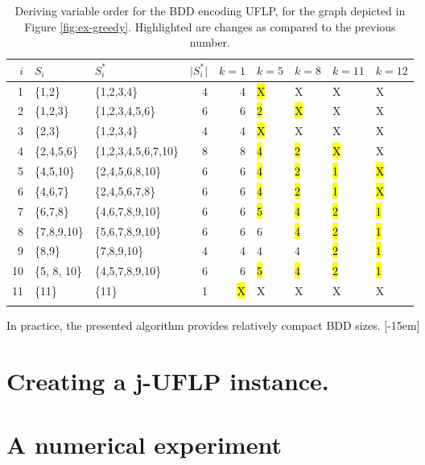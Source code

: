 \documentclass[11pt]{article}
\begin{document}
\begin{example}
\begin{table}[htbp]
\caption{\label{tab:greedy}Deriving variable order for the BDD encoding UFLP, for the graph depicted in Figure \ref{fig:ex-greedy}. Highlighted are changes as compared to the previous number.}
\centering
\begin{tabular}{rllrrllll}
\textcircled{$i$} & \(S_i\) & \(S^*_i\) & \(\vert S^*_i\vert\) & \(k=1\) & \(k=5\) & \(k=8\) & \(k=11\) & \(k=12\)\\
\hline
1 & \{1,2\} & \{1,2,3,4\} & 4 & 4 & \hl{X} & X & X & X\\
2 & \{1,2,3\} & \{1,2,3,4,5,6\} & 6 & 6 & \hl{2} & \hl{X} & X & X\\
3 & \{2,3\} & \{1,2,3,4\} & 4 & 4 & \hl{X} & X & X & X\\
4 & \{2,4,5,6\} & \{1,2,3,4,5,6,7,10\} & 8 & 8 & \hl{4} & \hl{2} & \hl{X} & X\\
5 & \{4,5,10\} & \{2,4,5,6,8,10\} & 6 & 6 & \hl{4} & \hl{2} & \hl{1} & \hl{X}\\
6 & \{4,6,7\} & \{2,4,5,6,7,8\} & 6 & 6 & \hl{4} & \hl{2} & \hl{1} & \hl{X}\\
7 & \{6,7,8\} & \{4,6,7,8,9,10\} & 6 & 6 & \hl{5} & \hl{4} & \hl{2} & \hl{1}\\
8 & \{7,8,9,10\} & \{5,6,7,8,9,10\} & 6 & 6 & 6 & \hl{4} & \hl{2} & \hl{1}\\
9 & \{8,9\} & \{7,8,9,10\} & 4 & 4 & 4 & 4 & \hl{2} & \hl{1}\\
10 & \{5, 8, 10\} & \{4,5,7,8,9,10\} & 6 & 6 & \hl{5} & \hl{4} & \hl{2} & \hl{1}\\
11 & \{11\} & \{11\} & 1 & \hl{X} & X & X & X & X\\
 &  &  &  &  &  &  &  & \\
\end{tabular}
\end{table}

\end{example}

In practice, the presented algorithm provides relatively compact BDD sizes.
[-15em]
\section{Creating a j-UFLP instance.}
\label{sec:org0a6dbae}

\section{A numerical experiment}
\label{sec:orgaf624d5}

\printbibliography
\end{document}
